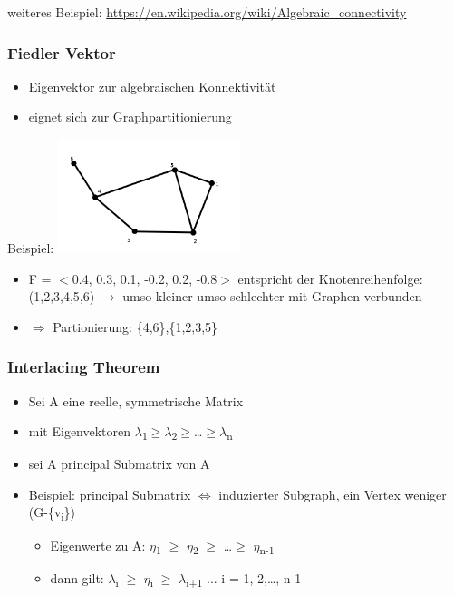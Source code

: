 weiteres Beispiel: \url{https://en.wikipedia.org/wiki/Algebraic_connectivity}

\newpage

\subsubsection{Fiedler Vektor}
\begin{itemize}
	\item Eigenvektor zur algebraischen Konnektivität
	\item eignet sich zur Graphpartitionierung
\end{itemize}

Beispiel:
\includegraphics[width=0.4\textwidth]{lectures/161028/pix/fiedler.png}
\begin{itemize}
	\item F = $<$0.4, 0.3, 0.1, -0.2, 0.2, -0.8$>$ entspricht der Knotenreihenfolge: (1,2,3,4,5,6) $\rightarrow$ umso kleiner umso schlechter mit Graphen verbunden
	\item $\Rightarrow$ Partionierung: \{4,6\},\{1,2,3,5\}\newline
\end{itemize}

\subsubsection{Interlacing Theorem}
\begin{itemize}
	\item Sei A eine reelle, symmetrische Matrix
	\item mit Eigenvektoren $\lambda$\textsubscript{1}$\geq$$\lambda$\textsubscript{2}$\geq$\ldots$\geq$$\lambda$\textsubscript{n}
	\item sei A\grq{} principal Submatrix von A
	\item Beispiel: principal Submatrix $\Leftrightarrow$ induzierter Subgraph, ein Vertex weniger (G-\{v\textsubscript{i}\})
	\begin{itemize}
		\item Eigenwerte zu A\grq{}: $\eta$\textsubscript{1} $\geq$ $\eta$\textsubscript{2} $\geq$ \ldots $\geq$ $\eta$\textsubscript{n-1}
		\item dann gilt: $\lambda$\textsubscript{i} $\geq$ $\eta$\textsubscript{i} $\geq$ $\lambda$\textsubscript{i+1} ... i = 1, 2,\ldots, n-1
	\end{itemize}
\end{itemize}


